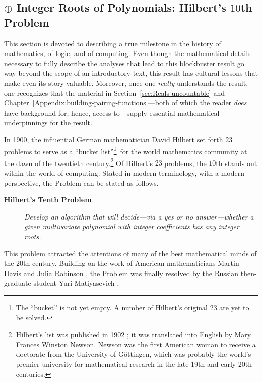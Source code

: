 \subsection{$\oplus$ Integer Roots of Polynomials: Hilbert's $10$th Problem}
\label{sec:Hilberts-Tenth}

This section is devoted to describing a true milestone in the history
of mathematics, of logic, and of computing.  Even though the
mathematical details necessary to fully describe the analyses that
lead to this blockbuster result go way beyond the scope of an
introductory text, this result has cultural lessons that make even its
story valuable.  Moreover, once one {\em really} understands the
result, one recognizes that the material in
Section~\ref{sec:Reals-uncountable} and
Chapter~\ref{Appendix:building-pairing-functions}---both of which the
reader {\em does} have background for, hence, access to---supply
essential mathematical underpinnings for the result.

In 1900, the influential German mathematician David Hilbert
 set forth $23$ problems to serve as a ``bucket
list''\footnote{The ``bucket'' is not yet empty.  A number of
  Hilbert's original $23$ are yet to be solved.}~for the world
mathematics community at the dawn of the twentieth
century.\footnote{Hilbert's list was published in 1902
  \cite{Hilbert02}; it was translated into English by Mary Frances
  Winston Newson.  Newson was the
  first American woman to receive a doctorate from the University of
  G\"{o}ttingen, which was probably the world's premier university for
  mathematical research in the late 19th and early 20th centuries.}
Of Hilbert's $23$ problems, the $10$th stands out within the world of
computing.  Stated in modern
terminology, with a modern perspective, the Problem can be stated as
follows.
\begin{description}
\item[{\bf Hilbert's Tenth Problem}]
{\it Develop an algorithm that will decide---via a {\sc yes} or {\sc
    no} answer---whether a given multivariate polynomial with integer
  coefficients has any integer roots.  }
\end{description}
This problem attracted the attentions of many of the best mathematical
minds of the $20$th century.  Building on the work of American
mathematicians Martin Davis  and Julia Robinson
, the Problem was finally resolved by the Russian
then-graduate student Yuri Matiyasevich .

